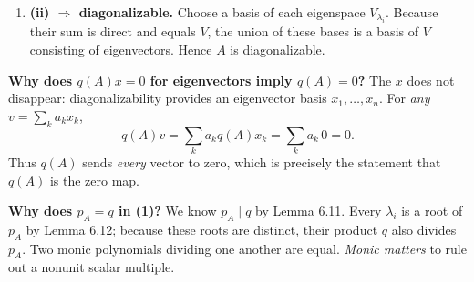 \documentclass[11pt,a4paper]{article}
\newenvironment{proofsteps}{\begin{enumerate}\setlength{\itemsep}{4pt}}{\end{enumerate}}
\begin{document}
\begin{proofsteps}
\textbf{Step 4: Show \(U_i\subseteq V_{\lambda_i}\).}
Multiplying the definition of \(p_i\) by the one factor it omits gives
\[
\begin{aligned}
(X-\lambda_i)p_i(X)
&=(X-\lambda_i)\prod_{j\neq i}\frac{X-\lambda_j}{\lambda_i-\lambda_j}\\
&=\frac{\prod_{k=1}^m(X-\lambda_k)}
{\prod_{j\neq i}(\lambda_i-\lambda_j)}
=\frac{p_A(X)}{\prod_{j\neq i}(\lambda_i-\lambda_j)}.
\end{aligned}
\]
The denominator is a nonzero scalar because the eigenvalues are distinct. Substitute \(A\) for \(X\) and use \(p_A(A)=0\):
\[
(A-\lambda_iI)E_i
=(A-\lambda_iI)p_i(A)
=\frac{p_A(A)}{\prod_{j\neq i}(\lambda_i-\lambda_j)}
=0.
\]
Take any \(u\in U_i=R(E_i)\). By the definition of image, \(u=E_iv\) for some \(v\in V\). Therefore
\[
(A-\lambda_iI)u=(A-\lambda_iI)E_iv=0,
\]
which is equivalent to \(Au=\lambda_i u\). Thus \(u\in N(A-\lambda_iI)=V_{\lambda_i}\), proving \(U_i\subseteq V_{\lambda_i}\).

Combining the inclusions gives \(U_i=V_{\lambda_i}\) for every \(i\). Replacing \(U_i\) in the direct sum from Step 2, we conclude
\[
\boxed{V=V_{\lambda_1}\oplus\cdots\oplus V_{\lambda_m}},
\]
as required.

\item \textbf{(ii) \(\Rightarrow\) diagonalizable.}
Choose a basis of each eigenspace \(V_{\lambda_i}\).
Because their sum is direct and equals \(V\), the union of these
bases is a basis of \(V\) consisting of eigenvectors. Hence \(A\)
is diagonalizable.
\end{proofsteps}

\begin{personalnote}
\textbf{Why does \(q(A)x=0\) for eigenvectors imply \(q(A)=0\)?}
The \(x\) does not disappear: diagonalizability provides an eigenvector
basis \(x_1,\ldots,x_n\). For \emph{any} \(v=\sum_k a_kx_k\),
\[
q(A)v=\sum_k a_kq(A)x_k=\sum_k a_k\,0=0.
\]
Thus \(q(A)\) sends \emph{every} vector to zero, which is precisely
the statement that \(q(A)\) is the zero map.
\end{personalnote}

\begin{personalnote}
\textbf{Why does \(p_A=q\) in (1)?}
We know \(p_A\mid q\) by Lemma 6.11. Every \(\lambda_i\) is a root
of \(p_A\) by Lemma 6.12; because these roots are distinct,
their product \(q\) also divides \(p_A\). Two monic polynomials
dividing one another are equal. \emph{Monic matters} to rule out
a nonunit scalar multiple.
\end{personalnote}
\end{document}
